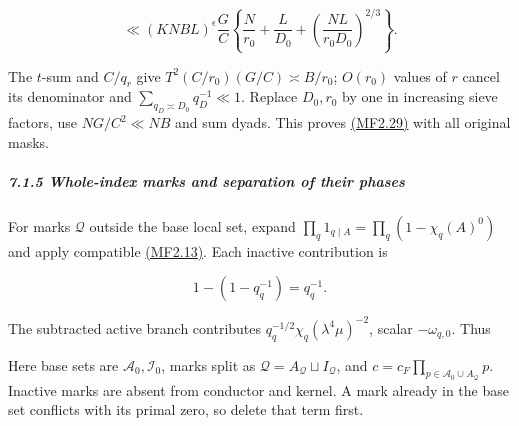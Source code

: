 \[
\ll(KNBL)^\epsilon\frac GC
\left\{\frac N{r_0}+\frac L{D_0}+
\left(\frac{NL}{r_0D_0}\right)^{2/3}\right\}.
\]

The \(t\)-sum and \(C/q_r\) give \(T^2(C/r_0)(G/C)\asymp B/r_0\); \(O(r_0)\) values of \(r\) cancel its denominator and \(\sum_{q_D\asymp D_0}q_D^{-1}\ll1\). Replace \(D_0,r_0\) by one in increasing sieve factors, use \(NG/C^2\ll NB\) and sum dyads. This proves \protect\hyperlink{mf:eq:B2.29}{(MF2.29)} with all original masks.

\hypertarget{whole-index-marks-and-separation-of-their-phases}{}

\label{whole-index-marks-and-separation-of-their-phases}

\hypertarget{whole-index-marks-and-separation-of-their-phases-heading-2}{%
\subparagraph{7.1.5 Whole-index marks and separation of their phases}}

For marks \(\mathcal Q\) outside the base local set, expand \(\prod_q1_{q\mid A}=\prod_q(1-\chi_q(A)^0)\) and apply compatible \protect\hyperlink{mf:eq:B2.13}{(MF2.13)}. Each inactive contribution is

\[
1-(1-q_q^{-1})=q_q^{-1}.
\]

The subtracted active branch contributes \(q_q^{-1/2}\chi_q(\lambda^4\mu)^{-2}\), scalar \(-\omega_{q,0}\). Thus

\hypertarget{mf:eq:B2.31}{}

\label{mf:eq:B2.31}

\par\noindent\resizebox{\linewidth}{!}{\begin{minipage}{\dimexpr\linewidth+39.11569pt\relax}\[
\begin{aligned}
\mathcal T_{\mathcal Q}(X;\Psi;V)
&=\sum_{\mathcal B}\zeta_{\mathcal Q}
\sum_{\mu\ne0}\frac{d(\mu)\alpha(\mu)\vartheta(\lambda^4\mu)}{\sqrt{q_\mu}}
\prod_{p\in\mathcal A_0}B_{p,j_p}(\lambda^4\mu)
\prod_{q\in A_{\mathcal Q}}q_q^{-1/2}\chi_q(\lambda^4\mu)^{-2}
V^\sharp(q_\mu X/q_c^2),\\
\zeta_{\mathcal Q}
&=-\frac i{81}\overline{\alpha(c)}^{\,2}
\widehat\varphi(h_0)\overline{\kappa_F}
\prod_{p\in\mathcal I_0}(1-q_p^{-1})\prod_{q\in I_{\mathcal Q}}q_q^{-1}
\prod_{p\in\mathcal A_0}\chi_p(\sigma_p)^{-2}\omega_{p,j_p}
\prod_{q\in A_{\mathcal Q}}\chi_q(\sigma_q)^{-2}(-\omega_{q,0}).
\end{aligned}
\qquad\text{(MF2.31)}
\]\end{minipage}}\par

Here base sets are \(\mathcal A_0,\mathcal I_0\), marks split as \(\mathcal Q=A_{\mathcal Q}\sqcup I_{\mathcal Q}\), and \(c=c_F\prod_{p\in\mathcal A_0\cup A_{\mathcal Q}}p\). Inactive marks are absent from conductor and kernel. A mark already in the base set conflicts with its primal zero, so delete that term first.

